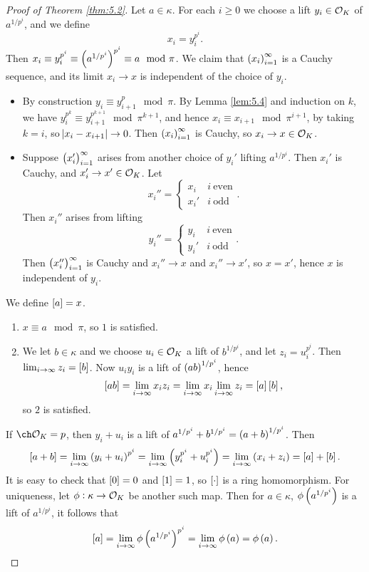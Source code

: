 \begin{proof}[Proof of Theorem \ref{thm:5.2}]
Let $ a \in \kappa $. For each $ i \ge 0 $ we choose a lift $ y_i \in \mathcal{O}_K $ of $ a^{1 / p^i} $, and we define
$$ x_i = y_i^{p^i}. $$
Then $ x_i \equiv y_i^{p^i} \equiv \br{a^{1 / p^i}}^{p^i} \equiv a \mod \pi $. We claim that $ \br{x_i}_{i = 1}^\infty $ is a Cauchy sequence, and its limit $ x_i \to x $ is independent of the choice of $ y_i $.
\begin{itemize}
\item By construction $ y_i \equiv y_{i + 1}^p \mod \pi $. By Lemma \ref{lem:5.4} and induction on $ k $, we have $ y_i^{p^k} \equiv y_{i + 1}^{p^{k + 1}} \mod \pi^{k + 1} $, and hence $ x_i \equiv x_{i + 1} \mod \pi^{i + 1} $, by taking $ k = i $, so $ \abs{x_i - x_{i + 1}} \to 0 $. Then $ \br{x_i}_{i = 1}^\infty $ is Cauchy, so $ x_i \to x \in \mathcal{O}_K $.
\item Suppose $ \br{x_i'}_{i = 1}^\infty $ arises from another choice of $ y_i' $ lifting $ a^{1 / p^i} $. Then $ x_i' $ is Cauchy, and $ x_i' \to x' \in \mathcal{O}_K $. Let
$$ x_i'' =
\begin{cases}
x_i & i \ \text{even} \\
x_i' & i \ \text{odd}
\end{cases}.
$$
Then $ x_i'' $ arises from lifting
$$ y_i'' =
\begin{cases}
y_i & i \ \text{even} \\
y_i' & i \ \text{odd}
\end{cases}.
$$
Then $ \br{x_i''}_{i = 1}^\infty $ is Cauchy and $ x_i'' \to x $ and $ x_i'' \to x' $, so $ x = x' $, hence $ x $ is independent of $ y_i $.
\end{itemize}
We define $ \sbr{a} = x $.
\begin{enumerate}
\item $ x \equiv a \mod \pi $, so $ 1 $ is satisfied.
\item We let $ b \in \kappa $ and we choose $ u_i \in \mathcal{O}_K $ a lift of $ b^{1 / p^i} $, and let $ z_i = u_i^{p^i} $. Then $ \lim_{i \to \infty} z_i = \sbr{b} $. Now $ u_iy_i $ is a lift of $ \br{ab}^{1 / p^i} $, hence
$$ \sbr{ab} = \lim_{i \to \infty} x_iz_i = \lim_{i \to \infty} x_i\lim_{i \to \infty} z_i = \sbr{a}\sbr{b}, $$
so $ 2 $ is satisfied.
\end{enumerate}

\pagebreak

If $ \ch \OOO_K = p $, then $ y_i + u_i $ is a lift of $ a^{1 / p^i} + b^{1 / p^i} = \br{a + b}^{1 / p^i} $. Then
$$ \sbr{a + b} = \lim_{i \to \infty} \br{y_i + u_i}^{p^i} = \lim_{i \to \infty} \br{y_i^{p^i} + u_i^{p^i}} = \lim_{i \to \infty} \br{x_i + z_i} = \sbr{a} + \sbr{b}. $$
It is easy to check that $ \sbr{0} = 0 $ and $ \sbr{1} = 1 $, so $ \sbr{\cdot} $ is a ring homomorphism. For uniqueness, let $ \phi : \kappa \to \mathcal{O}_K $ be another such map. Then for $ a \in \kappa $, $ \phi\br{a^{1 / p^i}} $ is a lift of $ a^{1 / p^i} $, it follows that
$$ \sbr{a} = \lim_{i \to \infty} \phi\br{a^{1 / p^i}}^{p^i} = \lim_{i \to \infty} \phi\br{a} = \phi\br{a}. $$
\end{proof}

